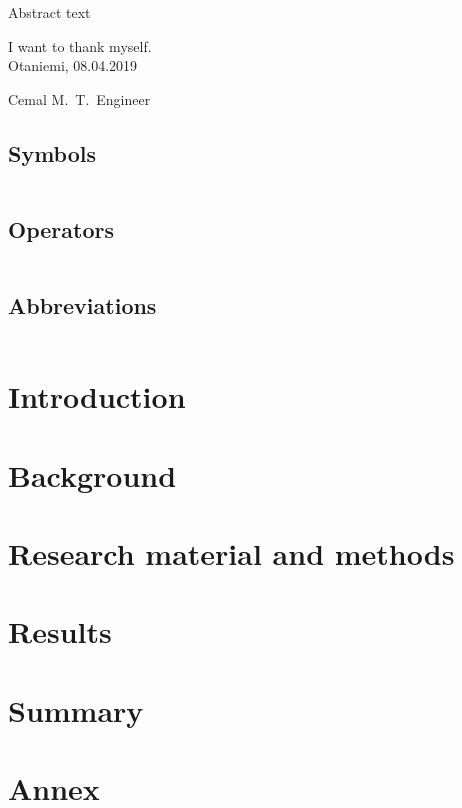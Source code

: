 \documentclass[english, 12pt, a4paper, elec, utf8, a-1b, online]{aaltothesis}
\date{08.04.2019}
\begin{document}
\makecoverpage
\makecopyrightpage
\begin{abstractpage}[english]
  Abstract text
\end{abstractpage}
I want to thank myself.\\

\vspace{5cm}
Otaniemi, 08.04.2019

\vspace{5mm}
{\hfill Cemal M.\ T.\ Engineer \hspace{1cm}}

\newpage
\thesistableofcontents

\subsection*{Symbols}
\begin{tabular}{ll}

\end{tabular}

\subsection*{Operators}
\begin{tabular}{ll}

\end{tabular}

\subsection*{Abbreviations}
\begin{tabular}{ll}

\end{tabular}


\cleardoublepage
\section{Introduction}


\thispagestyle{empty}



\clearpage
\section{Background}



\clearpage
\section{Research material and methods}


\clearpage
\section{Results}


\clearpage
\section{Summary} 


\clearpage
\thesisbibliography
\begin{thebibliography}{99}

\end{thebibliography}
\clearpage
\thesisappendix
\section{Annex \label{LiiteA}}


\clearpage
\end{document}
